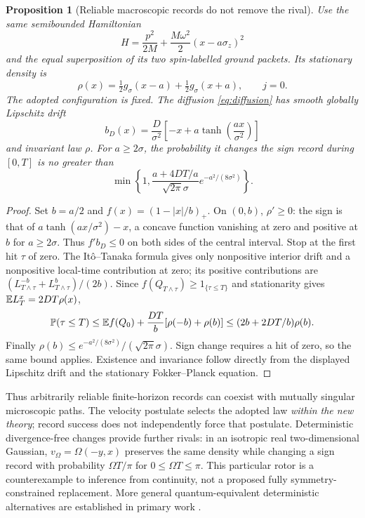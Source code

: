 \documentclass[11pt]{article}
\newtheorem{proposition}[theorem]{Proposition}
\theoremstyle{definition}\newtheorem{assumption}[theorem]{Constitutive assumption}
\theoremstyle{remark}\newtheorem{remark}[theorem]{Remark}
\newcommand{\Prb}{\mathbb P}\newcommand{\TV}{d_{\rm TV}}
\begin{document}
\begin{proposition}[Reliable macroscopic records do not remove the rival]\label{prop:rivalarchive}
Use the same semibounded Hamiltonian
\[
 H=\frac{p^2}{2M}+\frac{M\omega^2}{2}(x-a\sigma_z)^2
\]
and the equal superposition of its two spin-labelled ground packets. Its stationary density is
\[
 \rho(x)=\tfrac12g_\sigma(x-a)+\tfrac12g_\sigma(x+a),\qquad j=0.
\]
The adopted configuration is fixed. The diffusion \eqref{eq:diffusion} has smooth globally Lipschitz drift
\[
 b_D(x)=\frac D{\sigma^2}\left[-x+a\tanh\left(\frac{ax}{\sigma^2}\right)\right]
\]
and invariant law $\rho$. For $a\ge2\sigma$, the probability it changes the sign record during $[0,T]$ is no greater than
\begin{equation}\label{eq:rivalbound}
 \min\left\{1,\frac{a+4DT/a}{\sqrt{2\pi}\sigma}
                         e^{-a^2/(8\sigma^2)}\right\}.
\end{equation}
\end{proposition}
\begin{proof}
Set $b=a/2$ and $f(x)=(1-|x|/b)_+$. On $(0,b)$, $\rho'\ge0$: the sign is that of $a\tanh(ax/\sigma^2)-x$, a concave function vanishing at zero and positive at $b$ for $a\ge2\sigma$. Thus $f'b_D\le0$ on both sides of the central interval. Stop at the first hit $\tau$ of zero. The It\^o--Tanaka formula gives only nonpositive interior drift and a nonpositive local-time contribution at zero; its positive contributions are $(L_{T\wedge\tau}^{-b}+L_{T\wedge\tau}^{b})/(2b)$. Since $f(Q_{T\wedge\tau})\ge1_{\{\tau\le T\}}$ and stationarity gives $\mathbb E L_T^x=2DT\rho(x)$,
\[
 \Prb(\tau\le T)\le\E f(Q_0)+\frac{DT}{b}[\rho(-b)+\rho(b)]
 \le(2b+2DT/b)\rho(b).
\]
Finally $\rho(b)\le e^{-a^2/(8\sigma^2)}/(\sqrt{2\pi}\sigma)$. Sign change requires a hit of zero, so the same bound applies. Existence and invariance follow directly from the displayed Lipschitz drift and the stationary Fokker--Planck equation.
\end{proof}
Thus arbitrarily reliable finite-horizon records can coexist with mutually singular microscopic paths. The velocity postulate selects the adopted law \emph{within the new theory}; record success does not independently force that postulate. Deterministic divergence-free changes provide further rivals: in an isotropic real two-dimensional Gaussian, $v_\Omega=\Omega(-y,x)$ preserves the same density while changing a sign record with probability $\Omega T/\pi$ for $0\le\Omega T\le\pi$. This particular rotor is a counterexample to inference from continuity, not a proposed fully symmetry-constrained replacement. More general quantum-equivalent deterministic alternatives are established in primary work \cite{Deotto}.
\end{document}
